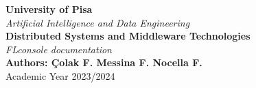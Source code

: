 \begin{titlepage}
    \centering
    \vspace*{\fill}
    {\LARGE \textbf{University of Pisa}}\\[0.5cm]
    {\Large \textit{Artificial Intelligence and Data Engineering}}\\[1.5cm]
    {\LARGE \textbf{Distributed Systems and Middleware Technologies}}\\[1cm]
    {\Large \textit{FLconsole documentation}}\\[10cm]
    {\large \textbf{Authors: Çolak F. Messina F. Nocella F.}}\\[0.5cm]
    {\large Academic Year 2023/2024}
    \vspace*{\fill}
\end{titlepage}

